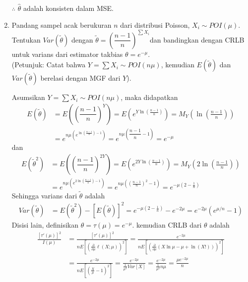 \documentclass{exam}
\newcommand{\del}{\partial}
\begin{document}
\begin{enumerate}
\begin{solution}
        $\therefore$ $\hat{\theta}$ adalah konsisten dalam MSE.
    \end{solution}
    \item Pandang sampel acak berukuran $n$ dari distribusi Poisson, $X_i\sim POI(\mu)$. Tentukan $Var(\tilde{\theta})$ dengan $\tilde{\theta}=\left(\dfrac{n-1}{n}\right)^{\sum X_i}$dan bandingkan dengan CRLB untuk varians dari estimator takbias $\theta=e^{-\mu}$.\\
    (Petunjuk: Catat bahwa $Y=\sum X_i\sim POI(n\mu)$, kemudian $E(\tilde{\theta})$ dan $Var(\tilde{\theta})$ berelasi dengan MGF dari $Y$).
    \begin{solution}
        Asumsikan $Y=\sum X_i\sim POI(n\mu)$, maka didapatkan 
        \begin{align*}
            E(\tilde{\theta}) &= E\left(\left(\dfrac{n-1}{n}\right)^Y\right) = E\left(e^{Y\ln\left(\frac{n-1}{n}\right)}\right) = M_Y\left(\ln\left(\frac{n-1}{n}\right)\right)\\
            &= e^{n\mu\left(e^{\ln\left(\frac{n-1}{n}\right)-1}\right)} = e^{n\mu\left(\dfrac{n-1}{n}-1\right)} = e^{-\mu}
        \end{align*}
        dan
        \begin{align*}
            E(\tilde{\theta}^2) &= E\left(\left(\dfrac{n-1}{n}\right)^{2Y}\right) = E\left(e^{2Y\ln\left(\frac{n-1}{n}\right)}\right) = M_Y\left(2\ln\left(\frac{n-1}{n}\right)\right)\\
            &= e^{n\mu\left(e^{2\ln\left(\frac{n-1}{n}\right)-1}\right)} = e^{n\mu\left((\frac{n-1}{n})^2-1\right)} = e^{-\mu(2-\frac{1}{n})}
        \end{align*}
        Sehingga varians dari $\tilde{\theta}$ adalah
        \begin{align*}
            Var(\tilde{\theta}) &= E(\tilde{\theta}^2) - [E(\tilde{\theta})]^2 = e^{-\mu(2-\frac{1}{n})} - e^{-2\mu} = e^{-2\mu}\left(e^{\mu/n}-1\right)
        \end{align*}
        Disisi lain, definisikan $\theta=\tau(\mu) = e^{-\mu}$. kemudian CRLB dari $\theta$ adalah
        \begin{align*}
            \frac{[\tau'(\mu)]^2}{I(\mu)} &= \frac{[\tau'(\mu)]^2}{nE\left[\left(\frac{\del}{\del\mu}\ell(X;\mu)\right)^2\right]}= \frac{e^{-2\mu}}{nE\left[\left(\frac{\del}{\del\mu}\left(X\ln\mu-\mu+\ln(X!)\right)\right)^2\right]}\\
            &= \frac{e^{-2\mu}}{nE\left[\left(\frac{X}{\mu}-1\right)^2\right]} = \frac{e^{-2\mu}}{\frac{1}{\mu^2}Var[X]}= \frac{e^{-2\mu}}{\frac{1}{\mu^2}n\mu}= \frac{\mu e^{-2\mu}}{n}

\end{align*}
\end{solution}
\end{enumerate}
\end{document}
